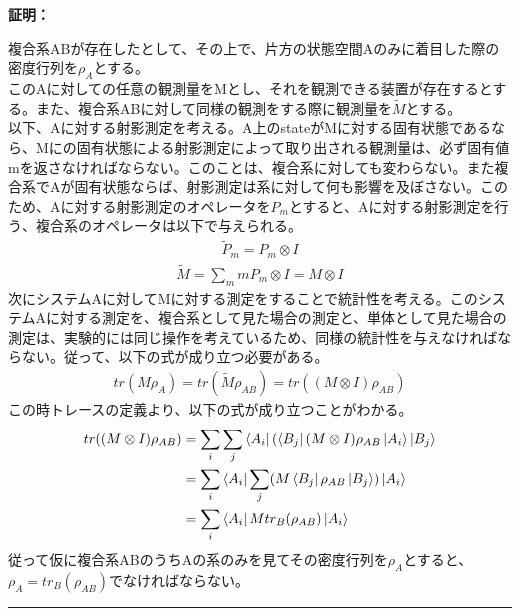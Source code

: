\documentclass[a4paper,10.5pt]{article}
\numberwithin{equation}{section}
\newenvironment{proofbox}
{\begin{prooflabel}\textbf{証明：}\end{prooflabel}\vspace{0.8em}}
{\par\vspace{1em}\hrule\vspace{1em}}
\begin{document}
\begin{proofbox}
複合系ABが存在したとして、その上で、片方の状態空間Aのみに着目した際の密度行列を$\rho_{A}$とする。\\
このAに対しての任意の観測量をMとし、それを観測できる装置が存在するとする。また、複合系ABに対して同様の観測をする際に観測量を$\tilde{M}$とする。\\
以下、Aに対する射影測定を考える。A上のstateがMに対する固有状態であるなら、Mにの固有状態による射影測定によって取り出される観測量は、必ず固有値mを返さなければならない。このことは、複合系に対しても変わらない。また複合系でAが固有状態ならば、射影測定は系に対して何も影響を及ぼさない。このため、Aに対する射影測定のオペレータを$P_{m}$とすると、Aに対する射影測定を行う、複合系のオペレータは以下で与えられる。
\begin{align}
\tilde{P}_{m}=P_{m}\otimes I
\end{align}
\begin{equation}\begin{split}
    \tilde{M} = \sum_{m} mP_{m} \otimes I = M \otimes I
\end{split} \end{equation}
次にシステムAに対してMに対する測定をすることで統計性を考える。このシステムAに対する測定を、複合系として見た場合の測定と、単体として見た場合の測定は、実験的には同じ操作を考えているため、同様の統計性を与えなければならない。従って、以下の式が成り立つ必要がある。
\begin{equation}\begin{split}
    tr(M\rho_{A}) = tr(\tilde{M}\rho_{AB})=tr((M \otimes I) \rho_{AB})
\end{split} \end{equation}
この時トレースの定義より、以下の式が成り立つことがわかる。
\begin{equation}\begin{split}
    tr((M \otimes I) \rho_{AB}) 
    &=\sum_{i}\sum_{j}\bra{A_{i}}(\bra{B_{j}} (M \otimes I)  \rho_{AB}\ket{A_{i}}\ket{B_{j}}\\
    &=\sum_{i}\bra{A_{i}} \sum_{j}(M\bra{B_{j}}\rho_{AB}\ket{B_{j}})\ket{A_{i}}\\
    &=\sum_{i}\bra{A_{i}}Mtr_{B}(\rho_{AB})\ket{A_{i}}\\
\end{split} \end{equation}
従って仮に複合系ABのうちAの系のみを見てその密度行列を$\rho_{A}$とすると、$\rho_{A}=tr_{B}(\rho_{AB})$でなければならない。
\end{proofbox}
\end{document}
